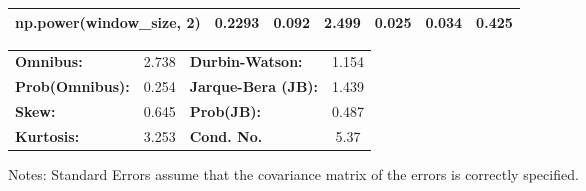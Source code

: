 \begin{center}
\begin{tabular}{lcccccc}
\textbf{np.power(window\_size, 2)}            &       0.2293  &        0.092     &     2.499  &         0.025        &        0.034    &        0.425     \\
\bottomrule
\end{tabular}
\begin{tabular}{lclc}
\textbf{Omnibus:}       &  2.738 & \textbf{  Durbin-Watson:     } &    1.154  \\
\textbf{Prob(Omnibus):} &  0.254 & \textbf{  Jarque-Bera (JB):  } &    1.439  \\
\textbf{Skew:}          &  0.645 & \textbf{  Prob(JB):          } &    0.487  \\
\textbf{Kurtosis:}      &  3.253 & \textbf{  Cond. No.          } &     5.37  \\
\bottomrule
\end{tabular}
\end{center}

Notes: \newline
 [1] Standard Errors assume that the covariance matrix of the errors is correctly specified.